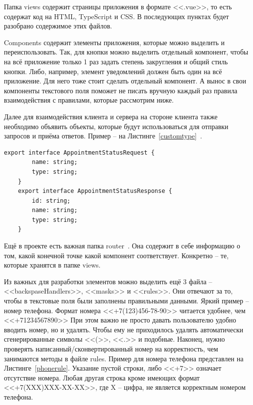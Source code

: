 \documentclass[a4paper,article]{article}
\begin{document}
\begin{sloppypar}
    Папка views содержит страницы приложения в формате <<.vue>>, то есть содержат код на HTML, TypeScript и CSS. В последующих пунктах будет разобрано содержимое этих файлов.

    Components содержит элементы приложения, которые можно выделить и переиспользовать. Так, для кнопки можно выделить отдельный компонент, чтобы на всё приложение только 1 раз задать степень закругления и общий стиль кнопки. Либо, например, элемент уведомлений должен быть один на всё приложение. Для него тоже стоит сделать отдельный компонент. А вынос в свои компоненты текстового поля поможет не писать вручную каждый раз правила взаимодействия с правилами, которые рассмотрим ниже.

    Далее для взаимодействия клиента и сервера на стороне клиента также необходимо объявить объекты, которые будут использоваться для отправки запросов и приёма ответов. Пример -- на Листинге~\ref{customtype}~\cite{vuejs}.

    \begin{lstlisting}[label=customtype,caption=Пример объявленных типов для обмена сообщениями с сервером]
    export interface AppointmentStatusRequest {
        name: string;
        type: string;
    }
    export interface AppointmentStatusResponse {
        id: string;
        name: string;
        type: string;
    }
    \end{lstlisting}

    Ещё в проекте есть важная папка router~\cite{vuejs}. Она содержит в себе информацию о том, какой конечной точке какой компонент соответствует. Конкретно -- те, которые хранятся в папке views.

    Из важных для разработки элементов можно выделить ещё 3 файла -- <<backspaseHandlers>>, <<masks>> и <<rules>>. Они отвечают за то, чтобы в текстовые поля были заполнены правильными данными. Яркий пример -- номер телефона. Формат номера <<+7(123)456-78-90>> читается удобнее, чем <<+71234567890>> При этом важно не просто давать пользователю удобно вводить номер, но и удалять. Чтобы ему не приходилось удалять автоматически сгенерированные символы <<(>>, <<.>> и подобные. Наконец, нужно проверять написанный/сконвертированный номер на корректность, чем занимаются методы в файле rules. Пример для номера телефона представлен на Листинге~\ref{phonerule}. Указание пустой строки, либо <<+7>> означает отсутствие номера. Любая другая строка кроме имеющих формат <<+7(XXX)XXX-XX-XX>>, где X -- цифра, не является корректным номером телефона.

    \newpage


\end{sloppypar}
\end{document}
